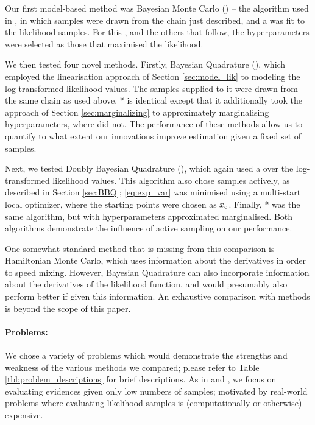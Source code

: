 \documentclass{article}
\begin{document}
Our first model-based method was Bayesian Monte Carlo () -- the algorithm used in \citep{BZMonteCarlo}, in which samples were drawn from the  chain just described, and a \gp was fit to the likelihood samples. For this \gp, and the others that follow, the hyperparameters were selected as those that maximised the likelihood. 

We then tested four novel methods. Firstly, Bayesian Quadrature (), which employed the linearisation approach of Section \ref{sec:model_lik} to modeling the log-transformed likelihood values. The samples supplied to it were drawn from the same  chain as used above. * is identical except that it additionally took the approach of Section \ref{sec:marginalizing} to approximately marginalising hyperparameters, where  did not. The performance of these methods allow us to quantify to what extent our innovations improve estimation given a fixed set of samples. 

Next, we tested Doubly Bayesian Quadrature (), which again used a \gpb over the log-transformed likelihood values. This algorithm also chose samples actively, as described in Section \ref{sec:BBQ}; \eqref{eq:exp_var} was minimised using a multi-start local optimizer, where the starting points were chosen as $\lfv_c$. Finally, * was the same algorithm, but with hyperparameters  approximated marginalised. Both algorithms demonstrate the influence of active sampling on our performance. 

One somewhat standard method that is missing from this comparison is Hamiltonian Monte Carlo, which uses information about the derivatives in order to speed mixing.  However, Bayesian Quadrature can also incorporate information about the derivatives of the likelihood function, and would presumably also perform better if given this information.  An exhaustive comparison with  methods is beyond the scope of this paper.

\paragraph{Problems:}
We chose a variety of problems which would demonstrate the strengths and weakness of the various methods we compared; please refer to Table \ref{tbl:problem_descriptions} for brief descriptions. As in \citet{BZMonteCarlo} and \citet{BQR}, we focus on evaluating evidences given only low numbers of samples; motivated by real-world problems where evaluating likelihood samples is (computationally or otherwise) expensive. 
\end{document}
